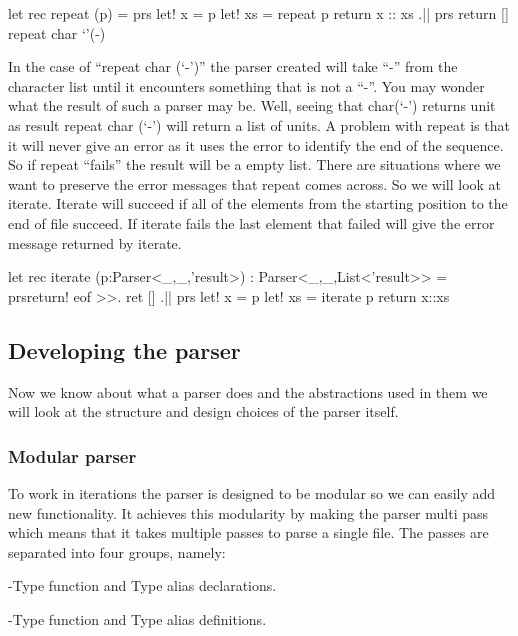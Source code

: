 \begin{code}
	let rec repeat (p) = 
		prs{ 
			let! x = p 
			let! xs = repeat p 
			return x :: xs 
		} .|| prs {return []} 
	repeat char ‘’(-) 
\end{code}

In the case of “repeat char (‘-’)” the parser created will take “-” from the character list until it encounters something that is not a “-”. You may wonder what the result of such a parser may be. Well, seeing that char(‘-’) returns unit as result repeat char (‘-’) will return a list of units. 
\linebreak
A problem with repeat is that it will never give an error as it uses the error to identify the end of the sequence. So if repeat “fails” the result will be a empty list. There are situations where we want to preserve the error messages that repeat comes across. 
\linebreak
So we will look at iterate. Iterate will succeed if all of the elements from the starting position to the end of file succeed. If iterate fails the last element that failed will give the error message returned by iterate. 

\begin{code}
	let rec iterate (p:Parser<_,_,'result>) : Parser<_,_,List<'result>> = 
	prs{return! eof >>. ret []} .|| 
	prs{ 
		let! x = p 
		let! xs = iterate p 
		return x::xs 
	}
\end{code}

\subsection{Developing the parser}
Now we know about what a parser does and the abstractions used in them we will look at the structure and design choices of the parser itself.

\subsubsection{Modular parser}

To work in iterations the parser is designed to be modular so we can easily add new functionality. It achieves this modularity by making the parser multi pass which means that it takes multiple passes to parse a single file.
\linebreak
The passes are separated into four groups, namely:

-Type function and Type alias declarations.

-Type function and Type alias definitions.


